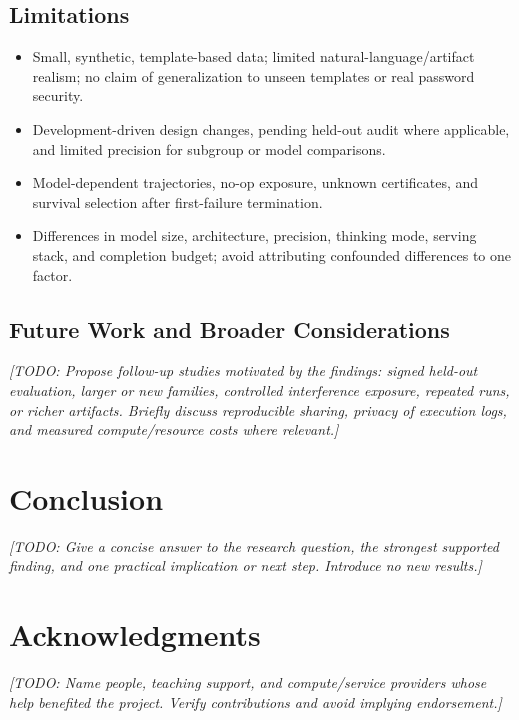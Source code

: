 \documentclass[11pt]{article}
\newcommand{\todo}[1]{\textit{[TODO: #1]}}
\newif\ifreferencesready
\begin{document}
\subsection{Limitations}
\begin{itemize}
  \item Small, synthetic, template-based data; limited natural-language/artifact
  realism; no claim of generalization to unseen templates or real password security.
  \item Development-driven design changes, pending held-out audit where applicable,
  and limited precision for subgroup or model comparisons.
  \item Model-dependent trajectories, no-op exposure, unknown certificates, and
  survival selection after first-failure termination.
  \item Differences in model size, architecture, precision, thinking mode,
  serving stack, and completion budget; avoid attributing confounded differences
  to one factor.
\end{itemize}

\subsection{Future Work and Broader Considerations}
\todo{Propose follow-up studies motivated by the findings: signed held-out
evaluation, larger or new families, controlled interference exposure, repeated
runs, or richer artifacts. Briefly discuss reproducible sharing, privacy of
execution logs, and measured compute/resource costs where relevant.}

\section{Conclusion}
\todo{Give a concise answer to the research question, the strongest supported
finding, and one practical implication or next step. Introduce no new results.}

\section*{Acknowledgments}
\todo{Name people, teaching support, and compute/service providers whose help
benefited the project. Verify contributions and avoid implying endorsement.}


\ifreferencesready
  
\else
\end{document}
